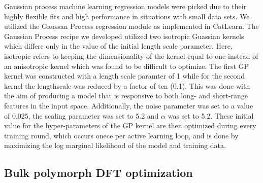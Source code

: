 %
%
Gaussian process machine learning regression models were picked due to their highly flexible fits and high performance in situations with small data sets.
%
We utilized the Gaussan Process regression module as implemented in CatLearn.
\cite{hansen2019atomistic,CatLearn_Repo}
%
The Gaussian Process recipe we developed utilized two isotropic Guassian kernels which differe only in the value of the initial length scale parameter.
%
Here, isotropic refers to keeping the dimensionality of the kernel equal to one instead of an anisotropic kernel which was found to be difficult to optimize.
%
The first GP kernel was constructed with a length scale paramter of 1 while for the second kernel the lengthscale was reduced by a factor of ten (0.1).
%
This was done with the aim of producing a model that is responsive to both long- and short-range features in the input space.
%
Additionally, the noise parameter was set to a value of \num{0.025}, the scaling parameter was set to \num{5.2} and $\alpha$ was set to 5.2.
%
These initial value for the hyper-parameters of the GP kernel are then optimized during every training round,
which occurs onece per active learning loop,
and is done by maximizing the log marginal likelihood of the model and training data.




\subsection{Bulk polymorph DFT optimization}  %


